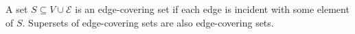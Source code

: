 A set $S \subseteq V \cup \mathcal{E}$ is an edge-covering set if each edge is incident with some element of $S$. Supersets of edge-covering sets are also edge-covering sets.